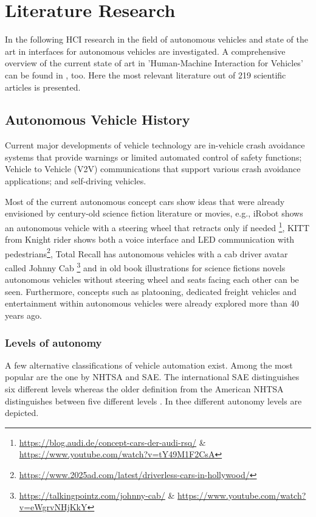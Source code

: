 \chapter{Literature Research}
\label{ch:literature}

In the following HCI research in the field of autonomous vehicles and state of the art in interfaces for autonomous vehicles are investigated. A comprehensive overview of the current state of art in 'Human-Machine Interaction for Vehicles' can be found in \cite{Kun2018}, too. Here the most relevant literature out of 219 scientific articles is presented. 

\section{Autonomous Vehicle History}\label{sec:history}
Current major developments of vehicle technology are in-vehicle crash avoidance systems that provide warnings or limited automated control of safety functions; Vehicle to Vehicle (V2V) communications that support various crash avoidance applications; and self-driving vehicles. 

Most of the current autonomous concept cars show ideas that were already envisioned by century-old science fiction literature or movies, e.g., iRobot shows an autonomous vehicle with a steering wheel that retracts only if needed \footnote{\url{https://blog.audi.de/concept-cars-der-audi-rsq/} \& \url{https://www.youtube.com/watch?v=tY49M1F2CsA}}, KITT from Knight rider shows both a voice interface and LED communication with pedestrians\footnote{\url{https://www.2025ad.com/latest/driverless-cars-in-hollywood/}}, Total Recall has autonomous vehicles with a cab driver avatar called Johnny Cab \footnote{\url{https://talkingpointz.com/johnny-cab/} \& \url{https://www.youtube.com/watch?v=eWgrvNHjKkY}} and in old book illustrations for science fictions novels autonomous vehicles without steering wheel and seats facing each other can be seen\cite{Radtke1974DieMorgen}. Furthermore, concepts such as platooning, dedicated freight vehicles and entertainment within autonomous vehicles were already explored more than 40 years ago. 

\subsection{Levels of autonomy}\label{ssec:levels}
A few alternative classifications of vehicle automation exist. Among the most popular are the one by NHTSA and SAE. The international SAE  distinguishes six different levels  \cite{SAEinternational2016} whereas the older definition from the American NHTSA  distinguishes between five different levels \cite{NHTSA2013}. In  thee different autonomy levels are depicted. 

